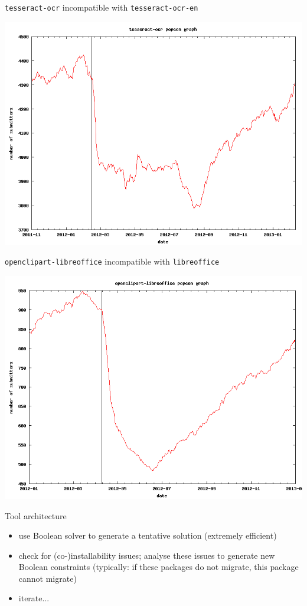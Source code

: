 \documentclass[xcolor={dvipsnames}]{beamer}
\begin{document}
\begin{frame}
\texttt{tesseract-ocr} incompatible with \texttt{tesseract-ocr-en}
\begin{center}
\includegraphics[width=0.8\linewidth]{figures/tesseract-ocr}
\end{center}
\end{frame}

\begin{frame}
\texttt{openclipart-libreoffice} incompatible with \texttt{libreoffice}
\begin{center}
\includegraphics[width=0.8\linewidth]{figures/openclipart-libreoffice}
\end{center}
\end{frame}

\begin{frame}{Tool architecture}

\begin{itemize}
\item
 use Boolean solver to generate a tentative solution
  (extremely efficient)
\item
 check for (co-)installability issues;
  analyse these issues to generate new Boolean constraints
  (typically: if these packages do not migrate, this package cannot migrate)
\item iterate...
\end{itemize}
\end{frame}
\end{document}
